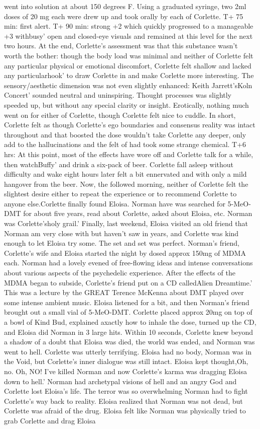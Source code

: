 \documentclass[12pt]{book}
\begin{document}
went into solution at about 150 degrees F. Using a graduated syringe, two 2ml doses of 20 mg each were drew up and took orally by each of Corlette. T+ 75 min: first alert. T+ 90 min: strong +2 which quickly progressed to a manageable +3 withbusy' open and closed-eye visuals and remained at this level for the next two hours. At the end, Corlette's assessment was that this substance wasn't worth the bother: though the body load was minimal and neither of Corlette felt any particular physical or emotional discomfort, Corlette felt shallow and lacked any particularhook' to draw Corlette in and make Corlette more interesting. The sensory/aesthetic dimension was not even slightly enhanced: Keith Jarrett'sKoln Concert' sounded neutral and uninspiring. Thought processes was slightly speeded up, but without any special clarity or insight. Erotically, nothing much went on for either of Corlette, though Corlette felt nice to cuddle. In short, Corlette felt as though Corlette's ego boundaries and consensus reality was intact throughout and that boosted the dose wouldn't take Corlette any deeper, only add to the hallucinations and the felt of had took some strange chemical. T+6 hrs: At this point, most of the effects have wore off and Corlette talk for a while, then watchBuffy' and drink a six-pack of beer. Corlette fall asleep without difficulty and wake eight hours later felt a bit ennervated and with only a mild hangover from the beer. Now, the followed morning, neither of Corlette felt the slightest desire either to repeat the experience or to recommend Corlette to anyone else.Corlette finally found Eloisa. Norman have was searched for 5-MeO-DMT for about five years, read about Corlette, asked about Eloisa, etc. Norman was Corlette'sholy grail.' Finally, last weekend, Eloisa visited an old friend that Norman am very close with but haven't saw in years, and Corlette was kind enough to let Eloisa try some. The set and set was perfect. Norman's friend, Corlette's wife and Eloisa started the night by dosed approx 150mg of MDMA each. Norman had a lovely evened of free-flowing ideas and intense conversations about various aspects of the psychedelic experience. After the effects of the MDMA began to subside, Corlette's friend put on a CD calledAlien Dreamtime.' This was a lecture by the GREAT Terence McKenna about DMT played over some intense ambient music. Eloisa listened for a bit, and then Norman's friend brought out a small vial of 5-MeO-DMT. Corlette placed approx 20mg on top of a bowl of Kind Bud, explained axactly how to inhale the dose, turned up the CD, and Eloisa did Norman in 3 large hits. Within 10 seconds, Corlette knew beyond a shadow of a doubt that Eloisa was died, the world was ended, and Norman was went to hell. Corlette was utterly terrifying. Eloisa had no body, Norman was in the Void, but Corlette's inner dialogue was still intact. Eloisa kept thought,Oh, no. Oh, NO! I've killed Norman and now Corlette's karma was dragging Eloisa down to hell.' Norman had archetypal visions of hell and an angry God and Corlette lost Eloisa's life. The terror was so overwhelming Norman had to fight Corlette's way back to reality. Eloisa realized that Norman was not dead, but Corlette was afraid of the drug. Eloisa felt like Norman was physically tried to grab Corlette and drag Eloisa 
\end{document}
